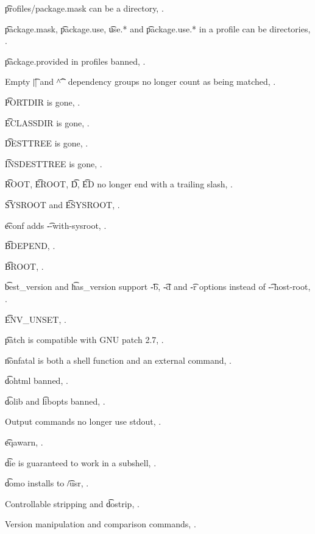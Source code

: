 \begin{compactitem}
\item \t{profiles/package.mask} can be a directory, .
\item \t{package.mask}, \t{package.use}, \t{use.*} and \t{package.use.*} in a profile can be
    directories, .
\item \t{package.provided} in profiles banned, .
\item Empty \t{||} and \t{\textasciicircum\textasciicircum} dependency groups no longer count as
    being matched, .
\item \t{PORTDIR} is gone, .
\item \t{ECLASSDIR} is gone, .
\item \t{DESTTREE} is gone, .
\item \t{INSDESTTREE} is gone, .
\item \t{ROOT}, \t{EROOT}, \t{D}, \t{ED} no longer end with a trailing slash,
    .
\item \t{SYSROOT} and \t{ESYSROOT}, .
\item \t{econf} adds \t{-{}-with-sysroot}, .
\item \t{BDEPEND}, .
\item \t{BROOT}, .
\item \t{best_version} and \t{has_version} support \t{-b}, \t{-d} and \t{-r} options instead of
    \t{-{}-host-root}, .
\item \t{ENV_UNSET}, .
\item \t{patch} is compatible with GNU patch 2.7, .
\item \t{nonfatal} is both a shell function and an external command, .
\item \t{dohtml} banned, .
\item \t{dolib} and \t{libopts} banned, .
\item Output commands no longer use stdout, .
\item \t{eqawarn}, .
\item \t{die} is guaranteed to work in a subshell, .
\item \t{domo} installs to \t{/usr}, .
\item Controllable stripping and \t{dostrip}, .
\item Version manipulation and comparison commands, .
\end{compactitem}

